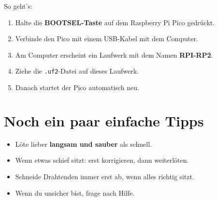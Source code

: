 \documentclass[a4paper,11pt]{article}
\begin{document}
So geht’s:
\begin{enumerate}
    \item Halte die \textbf{BOOTSEL-Taste} auf dem Raspberry Pi Pico gedrückt.
    \item Verbinde den Pico mit einem USB-Kabel mit dem Computer.
    \item Am Computer erscheint ein Laufwerk mit dem Namen \textbf{RPI-RP2}.
    \item Ziehe die \texttt{.uf2}-Datei auf dieses Laufwerk.
    \item Danach startet der Pico automatisch neu.
\end{enumerate}

\section*{Noch ein paar einfache Tipps}

\begin{itemize}
    \item Löte lieber \textbf{langsam und sauber} als schnell.
    \item Wenn etwas schief sitzt: erst korrigieren, dann weiterlöten.
    \item Schneide Drahtenden immer erst ab, wenn alles richtig sitzt.
    \item Wenn du unsicher bist, frage nach Hilfe.
\end{itemize}
\end{document}
